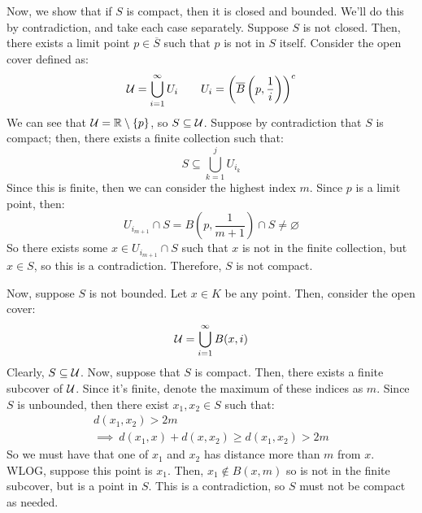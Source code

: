 \documentclass{article}
\begin{document}
\begin{pf}
    Now, we show that if $ S $ is compact, then it is closed and bounded.
    We'll do this by contradiction, and take each case separately. \vsp
    Suppose $ S $ is not closed. Then, there exists a limit point $ p \in \overline{S} $ such that
    $ p $ is not in $ S $ itself. \vsp
    Consider the open cover defined as:
    \begin{equation*}
        \mathcal{U} = \bigcup_{i=1}^{\infty} U_{i} \qquad
        U_{i} = \left(\overline{B} \left( p, \frac{1}{i} \right) \right)^{c}
    \end{equation*}
    We can see that $ \mathcal{U} = \mathbb{R} \setminus \left\{{p}\right\} $, so $ S \subseteq \mathcal{U} $.
    Suppose by contradiction that $ S $ is compact; then, there exists a finite collection
    such that:
    \begin{equation*}
        S \subseteq \bigcup_{k = 1}^{j} U_{i_{k}}
    \end{equation*}
    Since this is finite, then we can consider the highest index $ m $.
    Since $ p $ is a limit point, then:
    \begin{equation*}
        U_{i_{m+1}} \cap S = B \left( p, \frac{1}{m+1} \right) \cap S \neq \varnothing
    \end{equation*}
    So there exists some $ x \in U_{i_{m+1}} \cap S $ such that $ x $ is not in the finite
    collection, but $ x \in S $, so this is a contradiction. Therefore, $ S $ is not compact. \npgh

    Now, suppose $ S $ is not bounded. Let $ x \in K $ be any point. Then, consider the open cover:
    \begin{equation*}
        \mathcal{U} = \bigcup_{i = 1}^{\infty} B(x, i)
    \end{equation*}
    Clearly, $ S \subseteq \mathcal{U} $.
    Now, suppose that $ S $ is compact. Then, there exists a finite subcover of $ \mathcal{U} $.
    Since it's finite, denote the maximum of these indices as $ m $. \vsp
    Since $ S $ is unbounded, then there exist $ x_{1}, x_{2} \in S $ such that:
    \begin{gather*}
        d(x_{1}, x_{2}) > 2m \\
        \implies \ d(x_{1}, x) + d(x, x_{2}) \geq d(x_{1}, x_{2}) > 2m
    \end{gather*}
    So we must have that one of $ x_{1} $ and $ x_{2} $ has distance more than $ m $ from $ x $.
    WLOG, suppose this point is $ x_{1} $.
    Then, $ x_{1} \notin B(x, m) $ so is not in the finite subcover, but is a point in $ S $.
    This is a contradiction, so $ S $ must not be compact as needed.
\end{pf}
\end{document}
